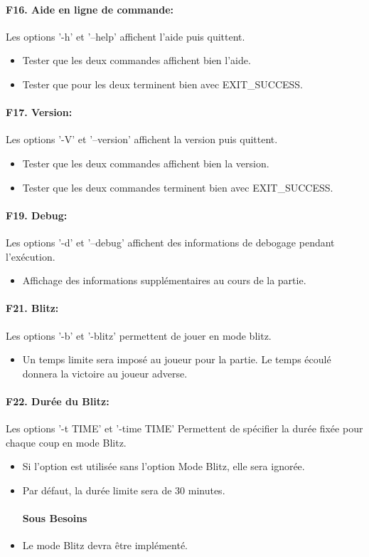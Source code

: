 \documentclass[a4paper,12pt]{article}
\begin{document}
\paragraph{F16. Aide en ligne de commande:} Les options '-h' et '--help' affichent l'aide puis quittent.
\begin{itemize}
  \item Tester que les deux commandes affichent bien l'aide.
  \item Tester que pour les deux terminent bien avec EXIT\_SUCCESS.
\end{itemize}

\paragraph{F17. Version:} Les options '-V' et '--version' affichent la version puis quittent.
\begin{itemize}
  \item Tester que les deux commandes affichent bien la version.
  \item Tester que les deux commandes terminent bien avec EXIT\_SUCCESS.
\end{itemize}

\paragraph{F19. Debug:} Les options '-d' et '--debug' affichent des informations de debogage pendant
l'exécution.
\begin{itemize}
  \item Affichage des informations supplémentaires au cours de la partie.
\end{itemize}

\paragraph{F21. Blitz:} Les options '-b' et '-blitz' permettent de jouer en mode blitz.
\begin{itemize}
  \item Un temps limite sera imposé au joueur pour la partie. Le temps écoulé donnera
        la victoire au joueur adverse.
\end{itemize}

\paragraph{F22. Durée du Blitz:} Les options '-t TIME' et '-time TIME' Permettent de spécifier la durée fixée
pour chaque coup en mode Blitz.
\begin{itemize}
  \item Si l'option est utilisée sans l'option Mode Blitz, elle sera ignorée.
  \item Par défaut, la durée limite sera de 30 minutes.
        \paragraph{Sous Besoins}
  \item Le mode Blitz devra être implémenté.
\end{itemize}
\end{document}
